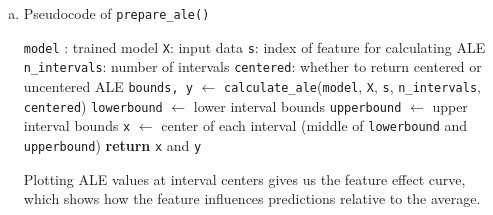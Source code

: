 {\begin{enumerate}[a)]
%

The cumulative sum reconstructs the main effect by integrating the local effects. Centering ensures the ALE has mean zero, so it represents deviations from the average prediction.

\item Pseudocode of  \texttt{prepare\_ale()}

\begin{algorithm}[ht]
\caption{\texttt{prepare\_ale()}}
\begin{algorithmic}[1]
\Require \texttt{model} : trained model
\Require \texttt{X}: input data 
\Require \texttt{s}: index of feature for calculating ALE
\Require \texttt{n\_intervals}: number of intervals 
\Require \texttt{centered}: whether to return centered or uncentered ALE
\State \texttt{bounds, y} $\gets$ \texttt{calculate\_ale}(\texttt{model}, \texttt{X}, \texttt{s}, \texttt{n\_intervals}, \texttt{centered})
\State \texttt{lowerbound} $\gets$ lower interval bounds
\State \texttt{upperbound} $\gets$ upper interval bounds
\State \texttt{x} $\gets$ center of each interval (middle of \texttt{lowerbound} and \texttt{upperbound})
\State \textbf{return}  \texttt{x} and \texttt{y}
\end{algorithmic}
\end{algorithm}

%

Plotting ALE values at interval centers gives us the feature effect curve, which shows how the feature influences predictions relative to the average.

%


\end{enumerate}
}